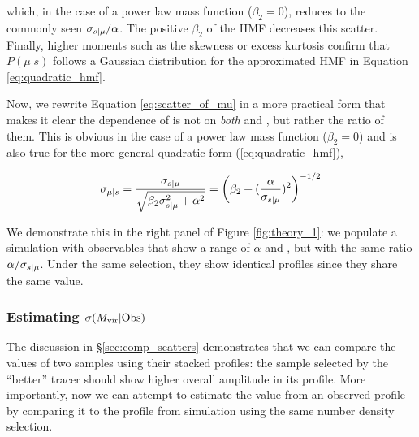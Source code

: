 \documentclass[fleqn,usenatbib,useAMS,english]{mnras}
\begin{document}
    \noindent which, in the case of a power law mass function ($\beta_2 = 0$), reduces to the
    commonly seen $\sigma_{s{} | \mu{}} / \alpha$. The positive $\beta_2$ of the HMF decreases
    this scatter. Finally, higher moments such as the skewness or excess kurtosis confirm that
    $P(\mu | s)$ follows a Gaussian distribution for the approximated HMF in
    Equation \ref{eq:quadratic_hmf}.

    Now, we rewrite Equation \ref{eq:scatter_of_mu} in a more practical form that makes it clear
    the dependence of \scatterMhaloObsSym{} is not on {\em both} \scatterObsSymMhalo{} and
    \slope, but rather the ratio of them.
    This is obvious in the case of a power law mass function ($\beta_2 = 0$) and is also true
    for the more general quadratic form (\ref{eq:quadratic_hmf}),

    \begin{equation}
        \sigma_{\mu{} | s{}}{}
        	= \frac{\sigma_{s{} | \mu{}}}{\sqrt{\beta_2 \sigma_{s{} | \mu{}}^2 + \alpha^2}}
            = \left(\beta_2 + (\frac{\alpha}{\sigma_{s{} | \mu{}}})^2\right)^{-1/2}
        \label{eq:ratio_is_what_matters}
    \end{equation}

    We demonstrate this in the right panel of Figure \ref{fig:theory_1}:
    we populate a simulation with observables that show a range of $\alpha$ and
    \scatterObsSymMhalo{}, but with the same ratio $\alpha / \sigma_{s{} | \mu{}}$.
    Under the same \topn{} selection, they show identical \dsigma{} profiles since they share the
    same \scatterMhaloObsSym{} value.


\subsubsection{Estimating $\sigma(M_{\rm vir} | {\rm Obs})$}
    \label{sec:estimate_scatter}

    The discussion in \S\ref{sec:comp_scatters} demonstrates that we can compare the
    \scatterMhaloObsSym{} values of two \topn{} samples using their stacked \dsigma{} profiles:
    the sample selected by the ``better'' \mhalo{} tracer should show higher overall amplitude in
    its \dsigma{} profile.
    More importantly, now we can attempt to estimate the \scatterMhaloObsSym{} value from an
    observed \dsigma{} profile by comparing it to the \dsigma{} profile from simulation using the
    same number density selection.
\end{document}
